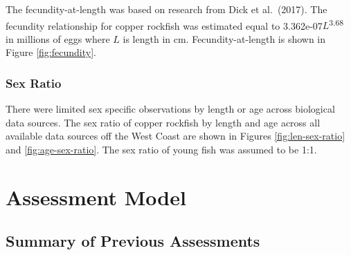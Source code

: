 \documentclass[11pt,
  english,
  a4paper,
]{article}
\begin{document}
\leavevmode\tagmcend\tagstructend\par


The fecundity-at-length was based on research from Dick et al.~{(2017)\leavevmode\tagmcend\tagstructend}. The fecundity relationship for copper rockfish was estimated equal to 3.362e-07{\(L\)\leavevmode\tagmcend\tagstructend}\textsuperscript{3.68} in millions of eggs where {\(L\)\leavevmode\tagmcend\tagstructend} is length in cm. Fecundity-at-length is shown in Figure \ref{fig:fecundity}.

\leavevmode\tagmcend\tagstructend\par


\hypertarget{sex-ratio}{%
\subsubsection{Sex Ratio}\label{sex-ratio}}

\leavevmode\tagmcend\tagstructend


There were limited sex specific observations by length or age across biological data sources. The sex ratio of copper rockfish by length and age across all available data sources off the West Coast are shown in Figures \ref{fig:len-sex-ratio} and \ref{fig:age-sex-ratio}. The sex ratio of young fish was assumed to be 1:1.

\leavevmode\tagmcend\tagstructend\par


\hypertarget{assessment-model}{%
\section{Assessment Model}\label{assessment-model}}

\leavevmode\tagmcend\tagstructend


\hypertarget{summary-of-previous-assessments}{%
\subsection{Summary of Previous Assessments}\label{summary-of-previous-assessments}}
\end{document}
